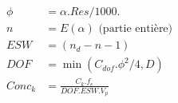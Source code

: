 \begin{align*}
\phi &= \alpha . Res /1000. \\
n  &= E(\alpha) \mbox{ (partie enti\`ere)}\\
ESW &= (n_d - n -1) \\ 
DOF &= \min ( C_{dof}.\phi^2 /4, D ) \\
Conc_k &= \frac{C_k.f_e}{DOF.ESW.V_p}
\end{align*}
